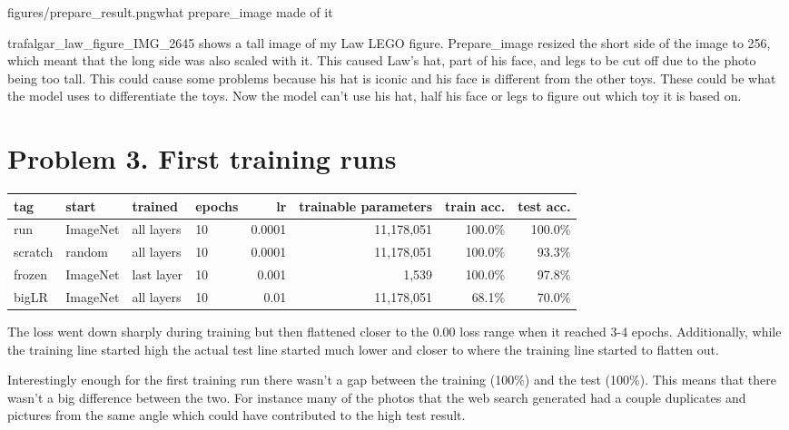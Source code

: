 \documentclass[11pt]{article}
\begin{document}
           {figures/prepare_result.png}{what prepare\_image made of it}

trafalgar\_law\_figure\_IMG\_2645 shows a tall image of my Law LEGO figure.
Prepare\_image resized the short side of the image to 256, which meant that the
long side was also scaled with it. This caused Law's hat, part of his face, and
legs to be cut off due to the photo being too tall. This could cause some
problems because his hat is iconic and his face is different from the other
toys. These could be what the model uses to differentiate the toys. Now the
model can't use his hat, half his face or legs to figure out which toy it is
based on.

\section*{Problem 3. First training runs}

\begin{center}\footnotesize
\begin{tabular}{llllrrrr}
\toprule
tag & start & trained & epochs & lr & trainable parameters & train acc. & test acc. \\
\midrule
run & ImageNet & all layers & 10 & 0.0001 & 11,178,051 & 100.0\% & 100.0\% \\
scratch & random & all layers & 10 & 0.0001 & 11,178,051 & 100.0\% & 93.3\% \\
frozen & ImageNet & last layer & 10 & 0.001 & 1,539 & 100.0\% & 97.8\% \\
bigLR & ImageNet & all layers & 10 & 0.01 & 11,178,051 & 68.1\% & 70.0\% \\
\bottomrule
\end{tabular}
\end{center}


The loss went down sharply during training but then flattened closer to the
0.00 loss range when it reached 3-4 epochs. Additionally, while the training
line started high the actual test line started much lower and closer to where
the training line started to flatten out.

Interestingly enough for the first training run there wasn't a gap between the
training (100\%) and the test (100\%). This means that there wasn't a big
difference between the two. For instance many of the photos that the web search
generated had a couple duplicates and pictures from the same angle which could
have contributed to the high test result.
\end{document}
